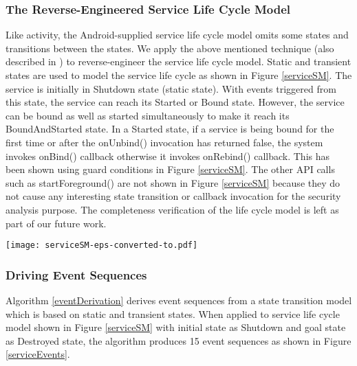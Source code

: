 \documentclass[10pt]{elsarticle}
\begin{document}
\subsubsection{The Reverse-Engineered Service Life Cycle Model}

Like activity, the Android-supplied service life cycle model omits some states and transitions between the states. We apply the above mentioned technique (also described in \cite{serviceLCMFrank}) to reverse-engineer the service life cycle model. Static and transient states are used to model the service life cycle as shown in Figure \ref{serviceSM}. The service is initially in Shutdown state (static state). With events triggered from this state, the service can reach its Started or Bound state. However, the service can be bound as well as started simultaneously to make it reach its BoundAndStarted state. In a Started state, if a service is being bound for the first time or after the {\ttfamily onUnbind()} invocation has returned false, the system invokes {\ttfamily onBind()} callback otherwise it invokes {\ttfamily onRebind()} callback. This has been shown using guard conditions in Figure \ref{serviceSM}. The other API calls such as {\ttfamily startForeground()} are not shown in Figure \ref{serviceSM} because they do not cause any interesting state transition or callback invocation for the security analysis purpose. The completeness verification of the life cycle model is left as part of our future work.

\begin{comment}
\begin{figure*}[ht!]
\centering
\epsfig{file=serviceSM.eps, width =120mm}
\caption{The Reverse-Engineered Service Life Cycle Model}
\label{serviceSM}
\end{figure*} 
\end{comment}

\begin{figure*}[ht!]
\centering
\texttt{[image: serviceSM-eps-converted-to.pdf]}
\caption{The Reverse-Engineered Service Life Cycle Model}
\label{serviceSM}
\end{figure*}


\subsubsection{Driving Event Sequences}

Algorithm \ref{eventDerivation} derives event sequences from a state transition model which is based on static and transient states. When applied to service life cycle model shown in Figure \ref{serviceSM} with initial state as Shutdown and goal state as Destroyed state, the algorithm produces 15 event sequences as shown in Figure \ref{serviceEvents}. 
\end{document}
